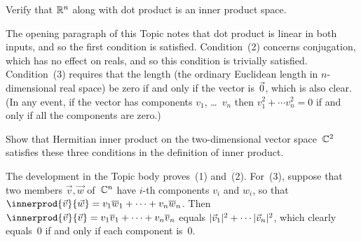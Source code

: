 \begin{exercises}
\item 
Verify that $\mathbb{R}^n$ along with dot product is an inner product space.
\begin{answer}
The opening paragraph of this Topic notes that dot product is linear
in both inputs, and so the first condition is satisfied.
Condition~(2) concerns conjugation, 
which has no effect on reals, and 
so this condition is trivially satisfied. 
Condition~(3) requires that the length (the ordinary Euclidean length
in $n$-dimensional real space) be zero if and only if the vector is~$\vec{0}$,
which is also clear.
(In any event, if the vector has components $v_1$, \ldots~$v_n$ then
$v_1^2+\cdots v_n^2=0$ if and only if all the components are zero.) 
\end{answer}

\item
Show that Hermitian inner product on the two-dimensional vector space~$\mathbb{C}^2$ 
satisfies these three conditions in the definition of inner product. 
\begin{answer}
The development in the Topic body proves~(1) and~(2).
For~(3), suppose that 
two members  $\vec{v},\vec{w}$ of~$\mathbb{C}^n$
have $i$-th components $v_i$ and $w_i$, so that
$\innerprod{\vec{v}}{\vec{w}}=v_1\compconj{w}_1+\cdots+v_n\compconj{w}_n$.
Then $\innerprod{\vec{v}}{\vec{v}}=v_1\compconj{v}_1+\cdots+v_n\compconj{v}_n$
equals $\lvert\vec{v}_1\rvert^2+\cdots \lvert\vec{v}_n\rvert^2$, 
which clearly equals~$0$ if and only if each component is~$0$.
\end{answer}


\end{exercises}
